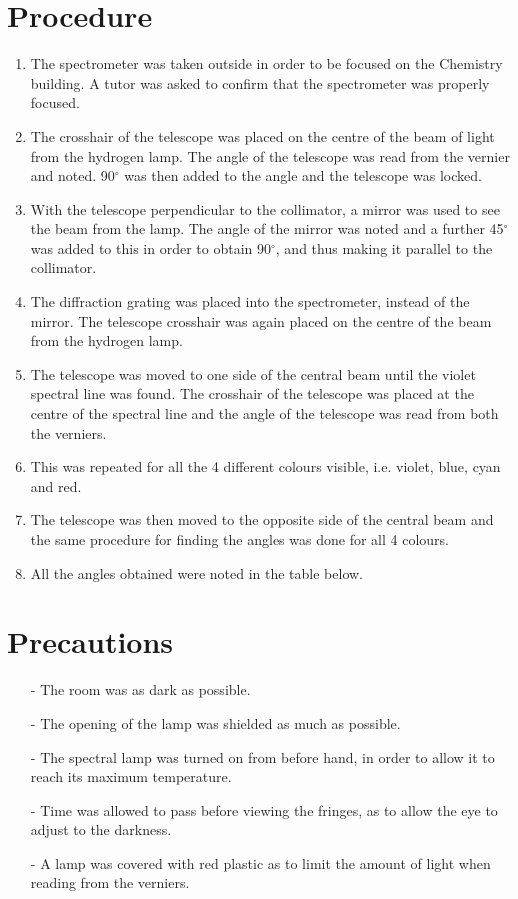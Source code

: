\documentclass[12pt, a4paper]{article}
\begin{document}
\section*{Procedure}
\begin{enumerate}
    \item The spectrometer was taken outside in order to be focused on the Chemistry building. A tutor was asked to confirm that the spectrometer was properly focused.
    \item The crosshair of the telescope was placed on the centre of the beam of light from the hydrogen lamp. The angle of the telescope was read from the vernier and noted. 90$^{\circ}$ was then added to the angle and the telescope was locked.
    \item With the telescope perpendicular to the collimator, a mirror was used to see the beam from the lamp. The angle of the mirror was noted and a further 45$^{\circ}$ was added to this in order to obtain 90$^{\circ}$, and thus making it parallel to the collimator.
    \item The diffraction grating was placed into the spectrometer, instead of the mirror. The telescope crosshair was again placed on the centre of the beam from the hydrogen lamp.
    \item The telescope was moved to one side of the central beam until the violet spectral line was found. The crosshair of the telescope was placed at the centre of the spectral line and the angle of the telescope was read from both the verniers.
    \item This was repeated for all the 4 different colours visible, i.e. violet, blue, cyan and red.
    \item The telescope was then moved to the opposite side of the central beam and the same procedure for finding the angles was done for all 4 colours. 
    \item All the angles obtained were noted in the table below.
\end{enumerate}

\section*{Precautions}
\begin{itemize}
    \item[-] The room was as dark as possible.
    \item[-] The opening of the lamp was shielded as much as possible.
    \item[-] The spectral lamp was turned on from before hand, in order to allow it to reach its maximum temperature.
    \item[-] Time was allowed to pass before viewing the fringes, as to allow the eye to adjust to the darkness.
    \item[-] A lamp was covered with red plastic as to limit the amount of light when reading from the verniers. 
\end{itemize}
\end{document}
